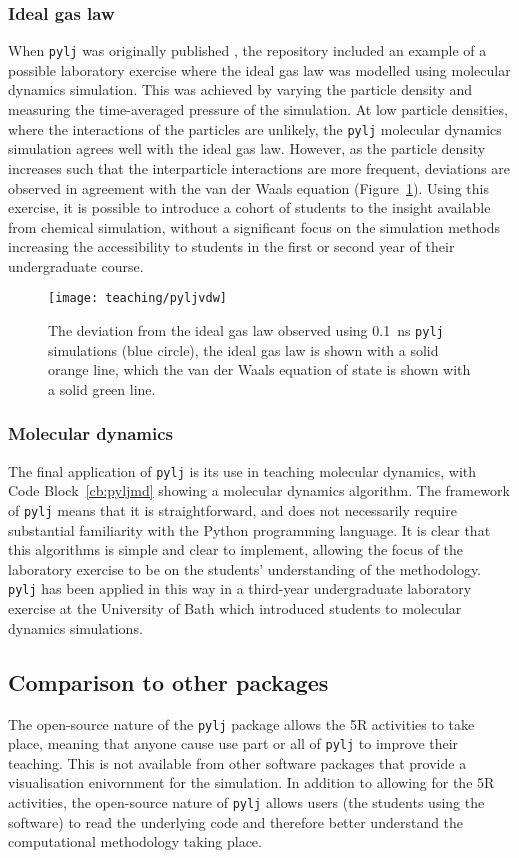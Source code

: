 \subsubsection{Ideal gas law}
When \texttt{pylj} was originally published \cite{mccluskey_pylj_2018}, the repository included an example of a possible laboratory exercise where the ideal gas law was modelled using molecular dynamics simulation.
This was achieved by varying the particle density and measuring the time-averaged pressure of the simulation.
At low particle densities, where the interactions of the particles are unlikely, the \texttt{pylj} molecular dynamics simulation agrees well with the ideal gas law.
However, as the particle density increases such that the interparticle interactions are more frequent, deviations are observed in agreement with the van der Waals equation (Figure~\ref{fig:vdw}).
Using this exercise, it is possible to introduce a cohort of students to the insight available from chemical simulation, without a significant focus on the simulation methods increasing the accessibility to students in the first or second year of their undergraduate course.
%
\begin{figure}
    \centering
    \texttt{[image: teaching/pyljvdw]}
    \caption{The deviation from the ideal gas law observed using \SI{0.1}{\nano\second} \texttt{pylj} simulations (blue circle), the ideal gas law is shown with a solid orange line, which the van der Waals equation of state is shown with a solid green line.}
    \label{fig:vdw}
\end{figure}
%

\subsubsection{Molecular dynamics}
The final application of \texttt{pylj} is its use in teaching molecular dynamics, with Code Block~\ref{cb:pyljmd} showing a molecular dynamics algorithm.
The framework of \texttt{pylj} means that it is straightforward, and does not necessarily require substantial familiarity with the Python programming language.
It is clear that this algorithms is simple and clear to implement, allowing the focus of the laboratory exercise to be on the students' understanding of the methodology.
\texttt{pylj} has been applied in this way in a third-year undergraduate laboratory exercise at the University of Bath which introduced students to molecular dynamics simulations.

\subsection{Comparison to other packages}
The open-source nature of the \texttt{pylj} package allows the 5R activities to take place, meaning that anyone cause use part or all of \texttt{pylj} to improve their teaching.
This is not available from other software packages that provide a visualisation enivornment for the simulation.
In addition to allowing for the 5R activities, the open-source nature of \texttt{pylj} allows users (the students using the software) to read the underlying code and therefore better understand the computational methodology taking place.

